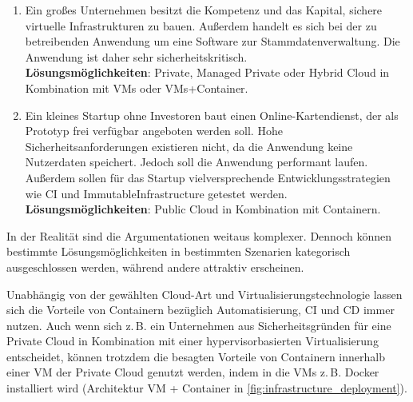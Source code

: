 \documentclass[../main.tex]{subfiles}
\begin{document}
  \begin{enumerate}
    \item Ein großes Unternehmen besitzt die Kompetenz und das Kapital, sichere virtuelle Infrastrukturen zu bauen. Außerdem handelt es sich bei der zu betreibenden Anwendung um eine Software zur Stammdatenverwaltung. Die Anwendung ist daher sehr sicherheitskritisch. \\
    \textbf{Lösungsmöglichkeiten}: Private, Managed Private oder Hybrid Cloud in Kombination mit VMs oder VMs+Container.
    \item Ein kleines Startup ohne Investoren baut einen Online-Kartendienst, der als Prototyp frei verfügbar angeboten werden soll. Hohe Sicherheitsanforderungen existieren nicht, da die Anwendung keine Nutzerdaten speichert. Jedoch soll die Anwendung performant laufen. Außerdem sollen für das Startup vielversprechende Entwicklungsstrategien wie \acrshort{CI} und \gls{ImmutableInfrastructure} getestet werden.  \\
    \textbf{Lösungsmöglichkeiten}: Public Cloud in Kombination mit Containern.
  \end{enumerate}

  \clearpage

  In der Realität sind die Argumentationen weitaus komplexer. Dennoch können bestimmte Lösungsmöglichkeiten in bestimmten Szenarien kategorisch ausgeschlossen werden, während andere attraktiv erscheinen.

  Unabhängig von der gewählten Cloud-Art und Virtualisierungstechnologie lassen sich die Vorteile von Containern bezüglich Automatisierung, \acrshort{CI} und \acrshort{CD} immer nutzen. Auch wenn sich z.\,B. ein Unternehmen aus Sicherheitsgründen für eine Private Cloud in Kombination mit einer hypervisorbasierten Virtualisierung entscheidet, können trotzdem die besagten Vorteile von Containern innerhalb einer VM der Private Cloud genutzt werden, indem in die VMs z.\,B. Docker installiert wird (Architektur \glqq{}VM + Container\grqq{} in \fig \ref{fig:infrastructure_deployment}).


\end{document}
